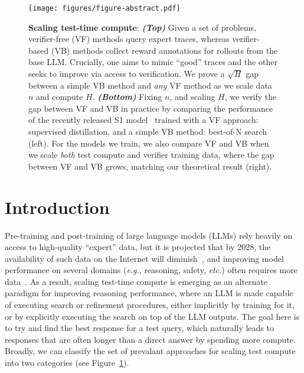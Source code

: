 \begin{figure}[!h]
    \centering
    \vspace{-0.3cm}
    \texttt{[image: figures/figure-abstract.pdf]}
    \vspace{-0.2cm}
    \caption{\footnotesize{\textbf{Scaling test-time compute}}: \textbf{\emph{(Top)}} Given a set of problems, verifier-free (VF) methods query expert traces, whereas verifier-based (VB) methods collect reward annotations for rollouts from the base LLM. Crucially, one aims to mimic ``good'' traces and the other seeks to improve via access to verification. We prove a $\sqrt{H}$ gap between a simple VB method and \emph{any} VF method as we scale data $n$ and compute $H$. \textbf{\emph{(Bottom)}} Fixing $n$, and scaling $H$, we verify the gap between VF and VB in practice by comparing the performance of the recently released S1 model~\cite{muennighoff2025s1} trained with a VF approach: supervised distillation, and a simple VB method: best-of-N search (left). For the models we train, we also compare VF and VB when we scale \emph{both} test compute and verifier training data, where the gap between VF and VB grows, matching our theoretical result (right).}
    \label{fig:abstract-figure}
    \vspace{0.38cm}
\end{figure}

\abscontent

\vspace{-1.4cm}
\section{Introduction}
\label{sec:introduction}
\vspace{-0.10cm}


Pre-training and post-training  of large language models (LLMs) rely heavily on access to high-quality {``expert''} data, but it is projected that by 2028, the availability of such data on the Internet will diminish~\citep{villalobos2022will,liu2024best}, and improving model performance on several domains (\textit{e.g.}, reasoning, safety, \textit{etc.}) often requires more data~\cite{li2024common}. 
As a result, scaling test-time compute is emerging as an alternate paradigm for improving reasoning performance, where an LLM is made capable of executing search or refinement procedures, either implicitly by training for it, or by explicitly executing the search on top of the LLM outputs. The goal here is to try and find the best response for a test query, which naturally leads to responses that are often longer than a direct answer by spending more compute. Broadly, we can classify the set of prevalant approaches for scaling test compute into two categories (see Figure~\ref{fig:abstract-figure}).


